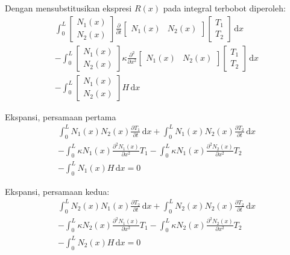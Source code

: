 Dengan mensubstitusikan ekspresi $R(x)$ pada integral terbobot diperoleh:
\begin{align*}
\int_{0}^{L} \begin{bmatrix} N_{1}(x) \\ N_{2}(x) \end{bmatrix}
\frac{\partial}{\partial t}
\begin{bmatrix} N_{1}(x) & N_{2}(x) \end{bmatrix}
\begin{bmatrix} T_{1} \\ T_{2} \end{bmatrix}\,\mathrm{d}x \\
- \int_{0}^{L} \begin{bmatrix} N_{1}(x) \\ N_{2}(x) \end{bmatrix}
\kappa \frac{\partial^2}{\partial x^2}
\begin{bmatrix} N_{1}(x) & N_{2}(x) \end{bmatrix}
\begin{bmatrix} T_{1} \\ T_{2} \end{bmatrix}\,\mathrm{d}x \\
- \int_{0}^{L} \begin{bmatrix} N_{1}(x) \\ N_{2}(x) \end{bmatrix} H \, \mathrm{d}x
\end{align*}

Ekspansi, persamaan pertama
\begin{align*}
\int_{0}^{L} N_{1}(x) N_{2}(x) \frac{\partial T_1}{\partial t}\, \mathrm{d}x
+ \int_{0}^{L} N_{1}(x) N_{2}(x) \frac{\partial T_2}{\partial t}\, \mathrm{d}x \\
- \int_{0}^{L} \kappa N_{1}(x) \frac{\partial^2 N_{1}(x)}{\partial x^2} T_{1}
- \int_{0}^{L} \kappa N_{1}(x) \frac{\partial^2 N_{2}(x)}{\partial x^2} T_{2} \\
- \int_{0}^{L} N_{1}(x) H \, \mathrm{d}x = 0
\end{align*}

Ekspansi, persamaan kedua:
\begin{align*}
\int_{0}^{L} N_{2}(x) N_{1}(x) \frac{\partial T_2}{\partial t}\, \mathrm{d}x
+ \int_{0}^{L} N_{2}(x) N_{2}(x) \frac{\partial T_2}{\partial t}\, \mathrm{d}x \\
- \int_{0}^{L} \kappa N_{2}(x) \frac{\partial^2 N_{1}(x)}{\partial x^2} T_{1}
- \int_{0}^{L} \kappa N_{2}(x) \frac{\partial^2 N_{2}(x)}{\partial x^2} T_{2} \\
- \int_{0}^{L} N_{2}(x) H \, \mathrm{d}x = 0
\end{align*}

